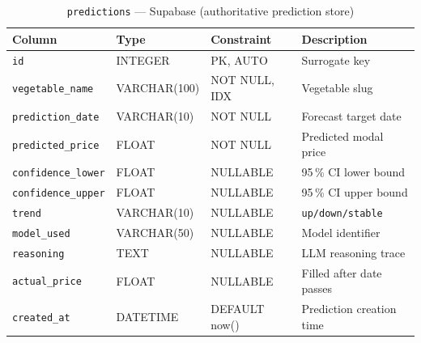 \documentclass[12pt, a4paper, oneside]{report}
\begin{document}
\begin{table}[H]
\centering
\caption{\texttt{predictions} — Supabase (authoritative prediction store)}
\label{tab:predictions}
\begin{tabularx}{\textwidth}{@{} L{3.0cm} L{2.2cm} L{2.5cm} X @{}}
\toprule
\textbf{Column} & \textbf{Type} & \textbf{Constraint} & \textbf{Description} \\
\midrule
\texttt{id}               & INTEGER     & PK, AUTO      & Surrogate key \\
\texttt{vegetable\_name}  & VARCHAR(100)& NOT NULL, IDX & Vegetable slug \\
\texttt{prediction\_date} & VARCHAR(10) & NOT NULL      & Forecast target date \\
\texttt{predicted\_price} & FLOAT       & NOT NULL      & Predicted modal price \\
\texttt{confidence\_lower}& FLOAT       & NULLABLE      & 95\,\% CI lower bound \\
\texttt{confidence\_upper}& FLOAT       & NULLABLE      & 95\,\% CI upper bound \\
\texttt{trend}            & VARCHAR(10) & NULLABLE      & \texttt{up/down/stable} \\
\texttt{model\_used}      & VARCHAR(50) & NULLABLE      & Model identifier \\
\texttt{reasoning}        & TEXT        & NULLABLE      & LLM reasoning trace \\
\texttt{actual\_price}    & FLOAT       & NULLABLE      & Filled after date passes \\
\texttt{created\_at}      & DATETIME    & DEFAULT now() & Prediction creation time \\
\bottomrule
\end{tabularx}
\end{table}
\end{document}
